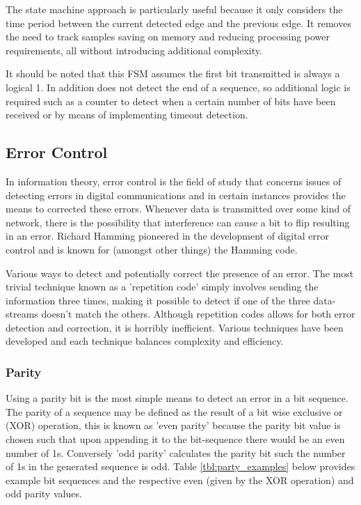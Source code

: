 The state machine approach is particularly useful because it only considers the time period between the current detected edge and the previous edge. It removes the need to track samples saving on memory and reducing processing power requirements, all without introducing additional complexity.

It should be noted that this FSM assumes the first bit transmitted is always a logical 1. In addition does not detect the end of a sequence, so additional logic is required such as a counter to detect when a certain number of bits have been received or by means of implementing timeout detection.

\subsection{Error Control}

In information theory, error control is the field of study that concerns issues of detecting errors in digital communications and in certain instances provides the means to corrected these errors. Whenever data is transmitted over some kind of network, there is the possibility that interference can cause a bit to flip resulting in an error. Richard Hamming pioneered in the development of digital error control and is known for (amongst other things) the Hamming code.

Various ways to detect and potentially correct the presence of an error. The most trivial technique known as a 'repetition code' simply involves sending the information three times, making it possible to detect if one of the three data-streams doesn't match the others. Although repetition codes allows for both error detection and correction, it is horribly inefficient. Various techniques have been developed and each technique balances complexity and efficiency.

\subsubsection{Parity}
Using a parity bit is the most simple means to detect an error in a bit sequence. The parity of a sequence may be defined as the result of a bit wise exclusive or (XOR) operation, this is known as 'even parity' because the parity bit value is chosen such that upon appending it to the bit-sequence there would be an even number of 1s. Conversely 'odd parity' calculates the parity bit such the number of 1s in the generated sequence is odd. Table \ref{tbl:party_examples} below provides example bit sequences and the respective even (given by the XOR operation) and odd parity values.

